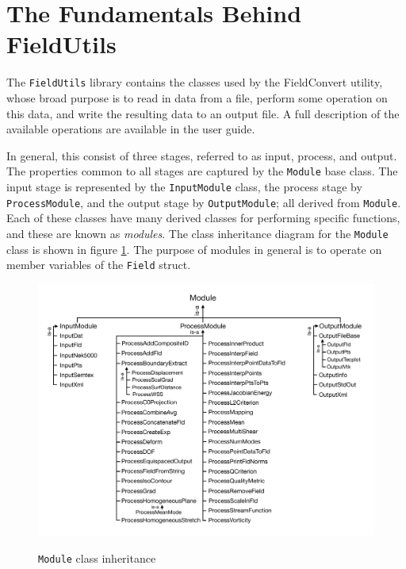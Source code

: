 %
\section{The Fundamentals Behind FieldUtils}

The \verb+FieldUtils+ library contains the classes used by the FieldConvert utility, whose broad purpose is to read in data from a file, perform some operation on this data, and write the resulting data to an output file. A full description of the available operations are available in the user guide.

In general, this consist of three stages, referred to as input, process, and output. The properties common to all stages are captured by the \verb+Module+ base class. The input stage is represented by the \verb+InputModule+ class, the process stage by \verb+ProcessModule+, and the output stage by \verb+OutputModule+; all derived from \verb+Module+. Each of these classes have many derived classes for performing specific functions, and these are known as \textit{modules}. The class inheritance diagram for the \verb+Module+ class is shown in figure \ref{fig:module_inheritance}. The purpose of modules in general is to operate on member variables of the \verb+Field+ struct.

\begin{figure}[htbp]
\centering
\includegraphics[width=\linewidth]{library/FieldUtils/img/ModuleInheritance.pdf}
\label{fig:module_inheritance}
\caption{\texttt{Module} class inheritance} 
\end{figure}